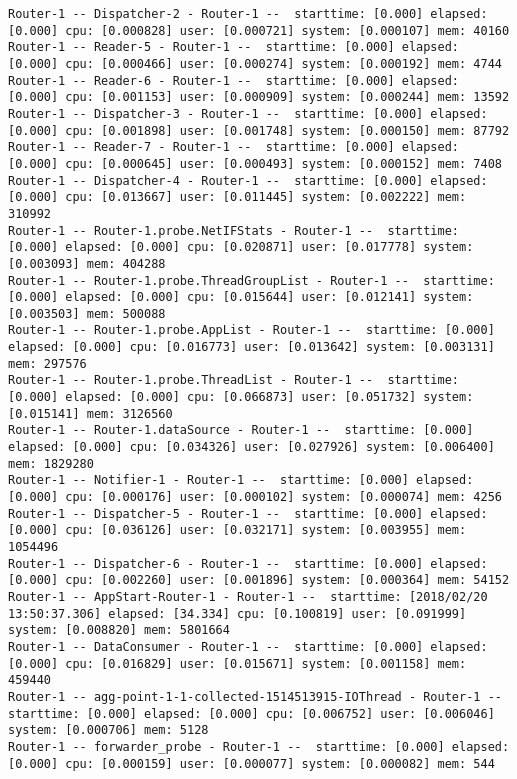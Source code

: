 \begin{lstlisting}[language=config]
Router-1 -- Dispatcher-2 - Router-1 --  starttime: [0.000] elapsed: [0.000] cpu: [0.000828] user: [0.000721] system: [0.000107] mem: 40160
Router-1 -- Reader-5 - Router-1 --  starttime: [0.000] elapsed: [0.000] cpu: [0.000466] user: [0.000274] system: [0.000192] mem: 4744
Router-1 -- Reader-6 - Router-1 --  starttime: [0.000] elapsed: [0.000] cpu: [0.001153] user: [0.000909] system: [0.000244] mem: 13592
Router-1 -- Dispatcher-3 - Router-1 --  starttime: [0.000] elapsed: [0.000] cpu: [0.001898] user: [0.001748] system: [0.000150] mem: 87792
Router-1 -- Reader-7 - Router-1 --  starttime: [0.000] elapsed: [0.000] cpu: [0.000645] user: [0.000493] system: [0.000152] mem: 7408
Router-1 -- Dispatcher-4 - Router-1 --  starttime: [0.000] elapsed: [0.000] cpu: [0.013667] user: [0.011445] system: [0.002222] mem: 310992
Router-1 -- Router-1.probe.NetIFStats - Router-1 --  starttime: [0.000] elapsed: [0.000] cpu: [0.020871] user: [0.017778] system: [0.003093] mem: 404288
Router-1 -- Router-1.probe.ThreadGroupList - Router-1 --  starttime: [0.000] elapsed: [0.000] cpu: [0.015644] user: [0.012141] system: [0.003503] mem: 500088
Router-1 -- Router-1.probe.AppList - Router-1 --  starttime: [0.000] elapsed: [0.000] cpu: [0.016773] user: [0.013642] system: [0.003131] mem: 297576
Router-1 -- Router-1.probe.ThreadList - Router-1 --  starttime: [0.000] elapsed: [0.000] cpu: [0.066873] user: [0.051732] system: [0.015141] mem: 3126560
Router-1 -- Router-1.dataSource - Router-1 --  starttime: [0.000] elapsed: [0.000] cpu: [0.034326] user: [0.027926] system: [0.006400] mem: 1829280
Router-1 -- Notifier-1 - Router-1 --  starttime: [0.000] elapsed: [0.000] cpu: [0.000176] user: [0.000102] system: [0.000074] mem: 4256
Router-1 -- Dispatcher-5 - Router-1 --  starttime: [0.000] elapsed: [0.000] cpu: [0.036126] user: [0.032171] system: [0.003955] mem: 1054496
Router-1 -- Dispatcher-6 - Router-1 --  starttime: [0.000] elapsed: [0.000] cpu: [0.002260] user: [0.001896] system: [0.000364] mem: 54152
Router-1 -- AppStart-Router-1 - Router-1 --  starttime: [2018/02/20 13:50:37.306] elapsed: [34.334] cpu: [0.100819] user: [0.091999] system: [0.008820] mem: 5801664
Router-1 -- DataConsumer - Router-1 --  starttime: [0.000] elapsed: [0.000] cpu: [0.016829] user: [0.015671] system: [0.001158] mem: 459440
Router-1 -- agg-point-1-1-collected-1514513915-IOThread - Router-1 --  starttime: [0.000] elapsed: [0.000] cpu: [0.006752] user: [0.006046] system: [0.000706] mem: 5128
Router-1 -- forwarder_probe - Router-1 --  starttime: [0.000] elapsed: [0.000] cpu: [0.000159] user: [0.000077] system: [0.000082] mem: 544

\end{lstlisting}
